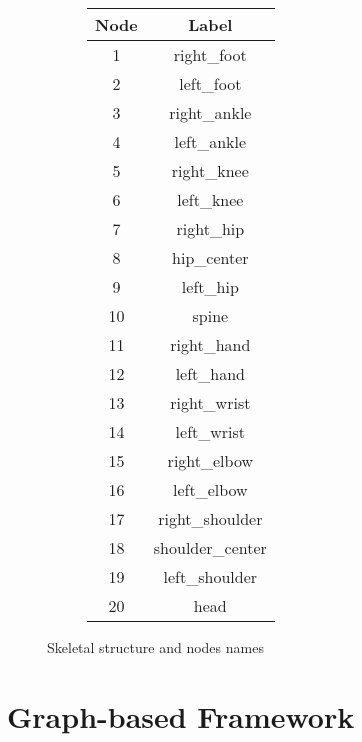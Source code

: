 \begin{figure}[H]
\begin{subfigure}[b]{0.7\linewidth}
  \end{subfigure}
  \label{fig:graph_skeletal}
  \begin{subfigure}[b]{0.29\linewidth}
    \centering
    \begin{table}[H]
      \centering
      \begin{tabular}{||c||c||}
        \hline
        \textbf{Node} & \textbf{Label} \\
        \hline
        1 & right\_foot \\
        2 & left\_foot \\
        3 & right\_ankle \\
        4 & left\_ankle \\
        5 & right\_knee \\
        6 & left\_knee \\
        7 & right\_hip \\
        8 & hip\_center \\
        9 & left\_hip \\
        10 & spine \\
        11 & right\_hand \\
        12 & left\_hand \\
        13 & right\_wrist \\
        14 & left\_wrist \\
        15 & right\_elbow \\
        16 & left\_elbow \\
        17 & right\_shoulder \\
        18 & shoulder\_center \\
        19 & left\_shoulder \\
        20 & head \\
        \hline
      \end{tabular}
    \end{table}
  \end{subfigure}
  \caption{Skeletal structure and nodes names}
  \label{tab:labels_joints}
\end{figure}


\section{Graph-based Framework}


